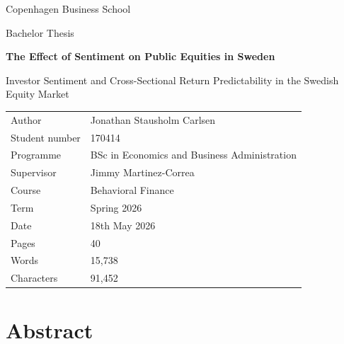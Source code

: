 \documentclass[11pt]{article}
\newcommand{\thesistitle}{The Effect of Sentiment on Public Equities in Sweden}
\newcommand{\thesistype}{Bachelor Thesis}
\newcommand{\thesisprogramme}{BSc in Economics and Business Administration}
\newcommand{\thesiscourse}{Behavioral Finance}
\newcommand{\thesisterm}{Spring 2026}
\newcommand{\wordcount}{15,738}
\newcommand{\charactercount}{91,452}
\newcommand{\supervisor}{Jimmy Martinez-Correa}
\newcommand{\thesisauthor}{Jonathan Stausholm Carlsen}
\newcommand{\thesisstudentnumber}{170414}
\newcommand{\thesisuniversity}{Copenhagen Business School}
\newcommand{\thesisdate}{18th May 2026}
\begin{document}
\hypersetup{pageanchor=false}
\begin{titlepage}
    \centering
    \vspace*{1.5cm}

    {\Large \thesisuniversity\par}
    \vspace{0.25cm}
    {\large \thesistype\par}

    \vspace{2.0cm}

    {\huge\bfseries \thesistitle\par}
    \vspace{0.4cm}
    {\large Investor Sentiment and Cross-Sectional Return Predictability in the Swedish Equity Market\par}

    \vspace{2.0cm}

    \begin{tabular}{@{}ll@{}}
        \toprule
        Author & \thesisauthor \\
        Student number & \thesisstudentnumber \\
        Programme & \thesisprogramme \\
        Supervisor & \supervisor \\
        Course & \thesiscourse \\
        Term & \thesisterm \\
        Date & \thesisdate \\
        \midrule
        Pages & 40 \\
        Words & \wordcount\\
        Characters & \charactercount \\
    \end{tabular}

    \vfill
\end{titlepage}

\hypersetup{pageanchor=true}

\tableofcontents
\clearpage


\section*{Abstract}
\end{document}
